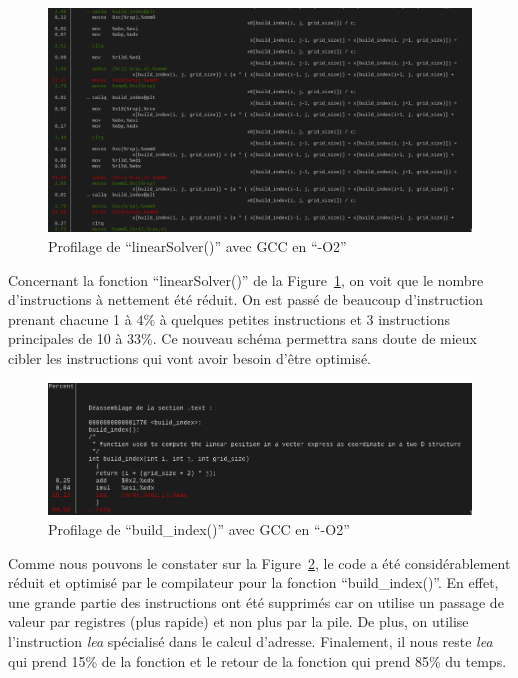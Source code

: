 \documentclass[12pt,a4paper]{article}
\begin{document}
\begin{figure}
    \centering
    \includegraphics[scale=0.35]{figures/optims/gcc-O2/linearSolver.png}
    \caption{Profilage de \enquote{linearSolver()} avec \ac{GCC} en \enquote{-O2}}
    \label{fig.optim.compil.gcc.linearSolver}
\end{figure}

Concernant la fonction \enquote{linearSolver()} de la
Figure~\ref{fig.optim.compil.gcc.linearSolver}, on voit que le nombre
d'instructions à nettement été réduit. On est passé de beaucoup d'instruction
prenant chacune 1 à $4\%$ à quelques petites instructions et 3 instructions
principales de 10 à 33\%. Ce nouveau schéma permettra sans doute de mieux cibler
les instructions qui vont avoir besoin d'être optimisé.

\begin{figure}
    \centering
    \includegraphics[scale=0.4]{figures/optims/gcc-O2/build_index.png}
    \caption{Profilage de \enquote{build\_index()} avec \ac{GCC} en \enquote{-O2}}
    \label{fig.optim.compil.gcc.build_index}
\end{figure}

Comme nous pouvons le constater sur la
Figure~\ref{fig.optim.compil.gcc.build_index}, le code a été considérablement
réduit et optimisé par le compilateur pour la fonction \enquote{build\_index()}.
En effet, une grande partie des instructions ont été supprimés car on utilise un
passage de valeur par registres (plus rapide) et non plus par la pile. De plus,
on utilise l'instruction \textit{lea} spécialisé dans le calcul d'adresse.
Finalement, il nous reste \textit{lea} qui prend 15\% de la fonction et le
retour de la fonction qui prend 85\% du temps.
\end{document}
